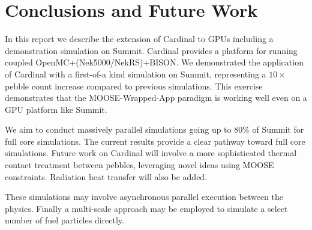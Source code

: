 
\section{Conclusions and Future Work}
\label{s:sum}

In this report we describe the extension of Cardinal to GPUs including a demonstration simulation on Summit.
Cardinal provides a platform for running coupled OpenMC+(Nek5000/NekRS)+BISON.
We demonstrated the application of Cardinal with a first-of-a kind simulation on Summit, representing a $10\times$ pebble count increase compared to previous simulations.
This exercise demonstrates that the MOOSE-Wrapped-App paradigm is working well even on a GPU platform like Summit.

We aim to conduct massively parallel simulations going up to 80\% of Summit for full core simulations.
The current results provide a clear pathway toward full core simulations.
Future work on Cardinal will involve a more sophisticated thermal contact treatment between pebbles, leveraging novel ideas using MOOSE constraints.
Radiation heat transfer will also be added.

These simulations may involve asynchronous parallel execution between the physics.
Finally a multi-scale approach may be employed to simulate a select number of fuel particles directly.
